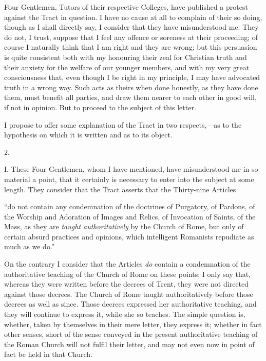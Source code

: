 Four Gentlemen, Tutors of their respective
Colleges, have published a protest against the Tract in question. I
have no cause at all to complain of their so doing, though as I shall
directly say, I consider that they have misunderstood me. They do not,
I trust, suppose that I feel any offence or soreness at their
proceeding; of course I naturally think that I am right and they are
wrong; but this persuasion is quite consistent both with my honouring
their zeal for Christian truth and their anxiety for the welfare of
our younger members, and with my very great consciousness that, even
though I be right in my principle, I may have advocated truth in a
wrong way. Such acts as theirs when done honestly, as they have done
them, must benefit all parties, and draw them nearer to each
other in good will, if not in opinion. But to proceed to the subject
of this letter.

I propose to offer some explanation of the Tract
in two respects,—as to the hypothesis on which it is written and as
to its object.

2.

I. These Four Gentlemen, whom I have
mentioned, have misunderstood me in so material a point, that it
certainly is necessary to enter into the subject at some length. They
consider that the Tract asserts that the Thirty-nine Articles

``do not contain
any condemnation of the doctrines of Purgatory, of Pardons, of the
Worship and Adoration of Images and Relics, of Invocation of Saints,
of the Mass, as they are \emph{taught authoritatively} by the Church
of Rome, but only of certain absurd practices and opinions, which
intelligent Romanists repudiate as much as we do.''

On the contrary I consider that the Articles \emph{do}
contain a condemnation of the authoritative teaching of the Church of
Rome on these points; I only say that, whereas they were written
before the decrees of Trent, they were not directed against those
decrees. The Church of Rome taught authoritatively before those
decrees as well as since. Those decrees expressed her authoritative
teaching, and they will continue to express it, while she so teaches.
The simple question is, whether, taken by themselves in their mere
letter, they express it; whether in fact other senses, short of the
sense conveyed in the present authoritative teaching of the Roman
Church will not fulfil their letter, and may not even now in point of
fact be held in that Church.


